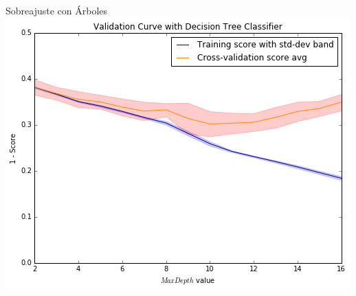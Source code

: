 \documentclass[xcolor=x11names]{beamer}
\begin{document}

\begin{frame}{Sobreajuste con Árboles }
\center\
\includegraphics[width=1\textheight]{figure-biasVariance/dtree_overfit_problem_2.png}
\end{frame}

\end{document}
